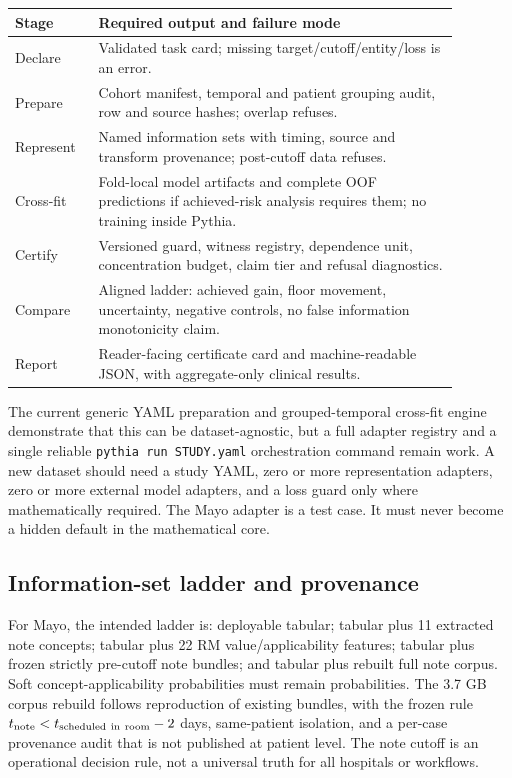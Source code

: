 \documentclass[11pt]{article}
\begin{document}
\begin{center}\small\begin{tabular}{p{0.16\linewidth}p{0.72\linewidth}}\toprule
Stage & Required output and failure mode\\\midrule
Declare & Validated task card; missing target/cutoff/entity/loss is an error.\\
Prepare & Cohort manifest, temporal and patient grouping audit, row and source hashes; overlap refuses.\\
Represent & Named information sets with timing, source and transform provenance; post-cutoff data refuses.\\
Cross-fit & Fold-local model artifacts and complete OOF predictions if achieved-risk analysis requires them; no training inside Pythia.\\
Certify & Versioned guard, witness registry, dependence unit, concentration budget, claim tier and refusal diagnostics.\\
Compare & Aligned ladder: achieved gain, floor movement, uncertainty, negative controls, no false information monotonicity claim.\\
Report & Reader-facing certificate card and machine-readable JSON, with aggregate-only clinical results.\\
\bottomrule\end{tabular}\normalsize\end{center}

The current generic YAML preparation and grouped-temporal cross-fit engine demonstrate that this can be dataset-agnostic, but a full adapter registry and a single reliable \texttt{pythia run STUDY.yaml} orchestration command remain work. A new dataset should need a study YAML, zero or more representation adapters, zero or more external model adapters, and a loss guard only where mathematically required. The Mayo adapter is a test case. It must never become a hidden default in the mathematical core.

\subsection{Information-set ladder and provenance}
For Mayo, the intended ladder is: deployable tabular; tabular plus 11 extracted note concepts; tabular plus 22 RM value/applicability features; tabular plus frozen strictly pre-cutoff note bundles; and tabular plus rebuilt full note corpus. Soft concept-applicability probabilities must remain probabilities. The 3.7 GB corpus rebuild follows reproduction of existing bundles, with the frozen rule $t_{\rm note}<t_{\rm scheduled\ in\ room}-2$ days, same-patient isolation, and a per-case provenance audit that is not published at patient level. The note cutoff is an operational decision rule, not a universal truth for all hospitals or workflows.
\end{document}
